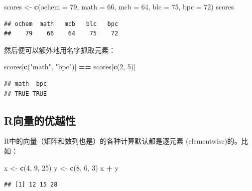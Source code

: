 \documentclass[]{book}
\newenvironment{Shaded}{\begin{snugshade}}{\end{snugshade}}
\newcommand{\DataTypeTok}[1]{\textcolor[rgb]{0.13,0.29,0.53}{#1}}
\newcommand{\DecValTok}[1]{\textcolor[rgb]{0.00,0.00,0.81}{#1}}
\newcommand{\KeywordTok}[1]{\textcolor[rgb]{0.13,0.29,0.53}{\textbf{#1}}}
\newcommand{\NormalTok}[1]{#1}
\newcommand{\OperatorTok}[1]{\textcolor[rgb]{0.81,0.36,0.00}{\textbf{#1}}}
\newcommand{\StringTok}[1]{\textcolor[rgb]{0.31,0.60,0.02}{#1}}
\begin{document}
\begin{Shaded}
\begin{Highlighting}[]
\NormalTok{scores <-}\StringTok{ }\KeywordTok{c}\NormalTok{(}\DataTypeTok{ochem =} \DecValTok{79}\NormalTok{, }\DataTypeTok{math =} \DecValTok{66}\NormalTok{, }\DataTypeTok{mcb =} \DecValTok{64}\NormalTok{, }\DataTypeTok{blc =} \DecValTok{75}\NormalTok{, }\DataTypeTok{bpc =} \DecValTok{72}\NormalTok{)}
\NormalTok{scores}
\end{Highlighting}
\end{Shaded}

\begin{verbatim}
## ochem  math   mcb   blc   bpc 
##    79    66    64    75    72
\end{verbatim}

然后便可以额外地用名字抓取元素：

\begin{Shaded}
\begin{Highlighting}[]
\NormalTok{scores[}\KeywordTok{c}\NormalTok{(}\StringTok{"math"}\NormalTok{, }\StringTok{"bpc"}\NormalTok{)] }\OperatorTok{==}\StringTok{ }\NormalTok{scores[}\KeywordTok{c}\NormalTok{(}\DecValTok{2}\NormalTok{, }\DecValTok{5}\NormalTok{)]}
\end{Highlighting}
\end{Shaded}

\begin{verbatim}
## math  bpc 
## TRUE TRUE
\end{verbatim}

\hypertarget{vectorization-basics}{%
\subsection{R向量的优越性}\label{vectorization-basics}}

R中的向量（矩阵和数列也是）的各种计算默认都是逐元素 (elementwise)的。比如：

\begin{Shaded}
\begin{Highlighting}[]
\NormalTok{x <-}\StringTok{ }\KeywordTok{c}\NormalTok{(}\DecValTok{4}\NormalTok{, }\DecValTok{9}\NormalTok{, }\DecValTok{25}\NormalTok{)}
\NormalTok{y <-}\StringTok{ }\KeywordTok{c}\NormalTok{(}\DecValTok{8}\NormalTok{, }\DecValTok{6}\NormalTok{, }\DecValTok{3}\NormalTok{)}
\NormalTok{x }\OperatorTok{+}\StringTok{ }\NormalTok{y}
\end{Highlighting}
\end{Shaded}

\begin{verbatim}
## [1] 12 15 28
\end{verbatim}
\end{document}
